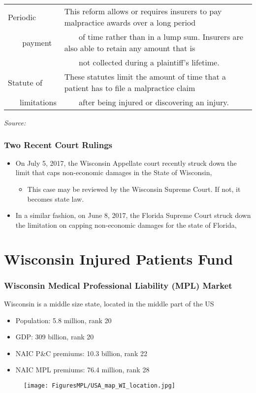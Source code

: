 \documentclass[serif,10pt]{beamer}
\begin{document}
\begin{frame}
\begin{tabular}{l|l}
Periodic& This reform allows or requires insurers to pay malpractice awards over a long period  \\
~~~ payment  & ~~~ of time rather than in a lump sum. Insurers are also able to retain any amount that is \\
&~~~ not collected during a plaintiff's lifetime. \\ \hline
Statute of   & These statutes limit the amount of time that a patient has to file a malpractice claim  \\
~~~limitations & ~~~ after being injured or discovering an injury. \\ \hline\hline
\end{tabular}

\bigskip

\textit{Source: }\cite{kachalia2011new}
\end{frame}

\begin{frame}
\frametitle{Two Recent Court Rulings}
  \begin{itemize}
\item On July 5, 2017, the Wisconsin Appellate court recently struck down the limit that caps non-economic damages in the State of Wisconsin,
\begin{itemize}\item This case may be reviewed by the Wisconsin Supreme Court. If not, it becomes state law.\end{itemize}
\item In a similar fashion, on June 8, 2017, the Florida Supreme Court struck down the limitation on capping non-economic damages for the state of Florida,
\end{itemize}
\end{frame}


\section{Wisconsin Injured Patients Fund}

\begin{frame}
\frametitle{Wisconsin Medical Professional Liability (MPL) Market}
Wisconsin is a middle size state, located in the middle part of the US
\begin{itemize}
\item Population: 5.8 million, rank 20
\item GDP: 309 billion, rank 20
\item NAIC P\&C premiums: 10.3 billion, rank 22
\item NAIC MPL premiums: 76.4 million, rank 28
\end{itemize}
\vspace{-.1in}
\begin{figure}[htp]
    \texttt{[image: FiguresMPL/USA\_map\_WI\_location.jpg]}
\end{figure}
\end{frame}
\end{document}
